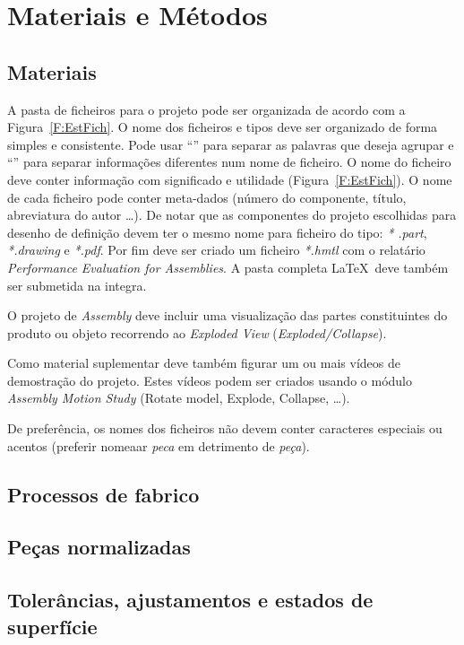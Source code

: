\cleardoublepage\chapter{Materiais e Métodos}\label{Cap3}

\section{Materiais}

A pasta de ficheiros para o projeto pode ser organizada de acordo com a
Figura~\ref{F:EstFich}. O nome dos ficheiros e tipos deve ser organizado de
forma simples e consistente. Pode usar ``\textendash'' para separar as
palavras que deseja agrupar e ``\textunderscore'' para separar informações
diferentes num nome de ficheiro. O nome do ficheiro deve conter informação com
significado e utilidade (\eg Figura~\ref{F:EstFich}). O nome de cada ficheiro pode
conter meta-dados (\eg número do componente, título, abreviatura do autor \ldots).
De notar que as componentes do projeto escolhidas para
desenho de definição devem ter o mesmo nome para ficheiro do tipo: \emph{*
.part}, \emph{*.drawing} e \emph{*.pdf}. Por fim
deve ser criado um ficheiro \emph{*.hmtl} com o relatário \emph{Performance
Evaluation for Assemblies}. A pasta completa \LaTeX~deve também ser
submetida na integra.

O projeto de \textit{Assembly} deve incluir uma visualização das partes
constituintes do produto ou objeto recorrendo
ao \textit{Exploded View}  (\textit{Exploded/Collapse}).

Como material suplementar deve também figurar um ou mais vídeos de
demostração do projeto. Estes vídeos podem ser criados usando o módulo
\textit{Assembly Motion Study} (\eg Rotate model, Explode, Collapse, \ldots).

De preferência, os nomes dos ficheiros não devem conter caracteres especiais ou
acentos (\eg preferir nomeaar \textit{peca} em
detrimento de \textit{peça}).

\section{Processos de fabrico}

\section{Peças normalizadas}

\section{Tolerâncias, ajustamentos e estados de superfície}

